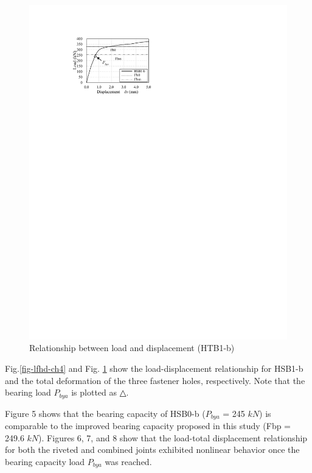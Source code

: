\begin{figure}[htbp]
\begin{minipage}[t]{0.48\textwidth}
    \includegraphics{imgs/ch4/ld-htb1b.pdf}
    \caption{Relationship between load and displacement (HTB1-b)}
    \label{fig-8ch4}
    \end{minipage}
    
\end{figure}

Fig.\ref{fig-lfhd-ch4} and Fig. \ref{fig-8ch4} show the load-displacement relationship for HSB1-b and the total deformation of the three fastener holes, respectively. Note that the bearing load $P_{bya}$ is plotted as △.

Figure 5 shows that the bearing capacity of HSB0-b ($P_{bya}$ = 245 $kN$) is comparable to the improved bearing capacity proposed in this study (Fbp = 249.6 $kN$). Figures 6, 7, and 8 show that the load-total displacement relationship for both the riveted and combined joints exhibited nonlinear behavior once the bearing capacity load $P_{bya}$ was reached.

